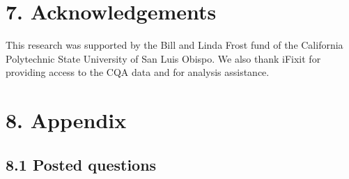 \documentclass{article}
\begin{document}

\section*{7. Acknowledgements}

This research was supported by the Bill and Linda Frost fund of the California Polytechnic State University of San Luis Obispo. We also thank iFixit for providing access to the CQA data and for analysis assistance.


\section*{8. Appendix} 

\subsection*{8.1 Posted questions}

\end{document}
